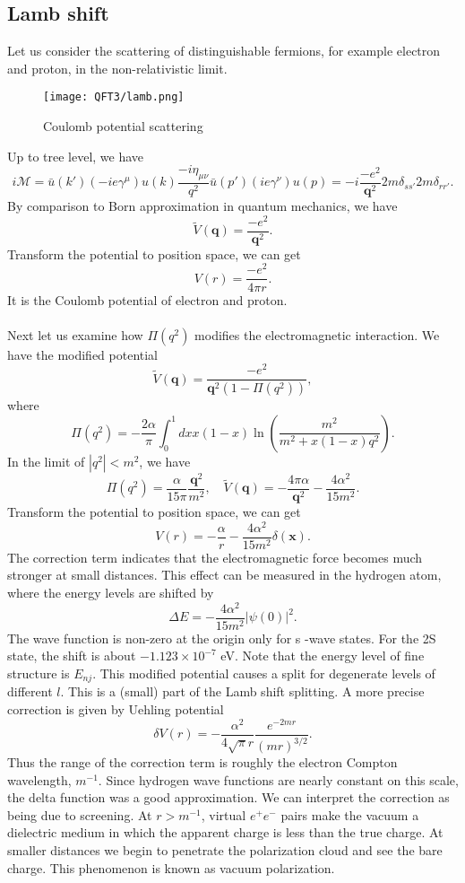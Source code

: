 \subsection{Lamb shift}
Let us consider the scattering of distinguishable fermions, for example electron and proton, in the non-relativistic limit. 

\begin{figure}[!h]
\centering
\texttt{[image: QFT3/lamb.png]}
\caption{Coulomb potential scattering} 
\end{figure}

\noindent
Up to tree level, we have
\[i\mathcal{M} = \bar{u}(k')(-ie\gamma^{\mu})u(k) \frac{-i\eta_{\mu\nu}}{q^2} \bar{u}(p')(ie\gamma^{\nu})u(p) = -i \frac{-e^2}{\bm{q}^2} 2m \delta_{ss'} 2m\delta_{rr'}.\]
By comparison to Born approximation in quantum mechanics, we have
\[\tilde{V}(\bm{q}) = \frac{-e^2}{\bm{q}^2}.\]
Transform the potential to position space, we can get
\[V(r) = \frac{-e^2}{4\pi r}.\]
It is the Coulomb potential of electron and proton.
\\ \\
Next let us examine how $\Pi(q^2)$ modifies the electromagnetic interaction. We have the modified potential
\[\tilde{V}(\bm{q}) = \frac{-e^2}{\bm{q}^2(1-\Pi(q^2))},\]
where
\[\Pi(q^2) = -\frac{2\alpha}{\pi} \int_0^1 dx x(1-x) \ln \left( \frac{m^2}{m^2 + x(1-x)q^2} \right).\]
In the limit of $|q^2|<m^2$, we have
\[\Pi(q^2) = \frac{\alpha}{15\pi}\frac{\bm{q}^2}{m^2} , \quad \tilde{V}(\bm{q}) = -\frac{4\pi\alpha}{\bm{q}^2} - \frac{4\alpha^2}{15m^2}.\]
Transform the potential to position space, we can get
\[V(r) = -\frac{\alpha}{r} - \frac{4\alpha^2}{15m^2} \delta(\bm{x}).\]
The correction term indicates that the electromagnetic force becomes much stronger at small distances. This effect can be measured in the hydrogen atom, where the energy levels are shifted by
\[\Delta E = - \frac{4\alpha^2}{15m^2} |\psi(0)|^2.\]
The wave function is non-zero at the origin only for s -wave states. For the 2S state, the shift is about $-1.123 \times 10^{-7}$ eV. Note that the energy level of fine structure is $E_{nj}$. This modified potential causes a split for degenerate levels of different $l$. This is a (small) part of the Lamb shift splitting.
A more precise correction is given by Uehling potential
\[\delta V(r) = -\frac{\alpha^2}{4\sqrt{\pi}r} \frac{e^{-2mr}}{(mr)^{3/2}}.\]
Thus the range of the correction term is roughly the electron Compton wavelength, $m^{-1}$. 
Since hydrogen wave functions are nearly constant on this scale, the delta function was a good approximation.
We can interpret the correction as being due to screening. At $r > m^{-1}$, virtual $e^+e^-$ pairs make the vacuum a dielectric medium in which the apparent charge is less than the true charge. 
At smaller distances we begin to penetrate the polarization cloud and see the bare charge. This phenomenon is known as vacuum polarization.
